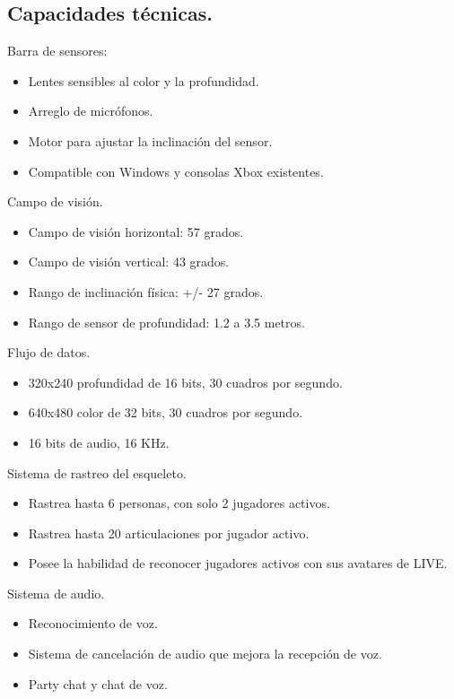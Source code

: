 \documentclass[11pt,a4paper]{article}
\begin{document}
\subsection{Capacidades técnicas.}
Barra de sensores: \cite{Play.com}  
\begin{itemize} %
\item Lentes sensibles al color y la profundidad.
\item Arreglo de micrófonos.
\item Motor para ajustar la inclinación del sensor.
\item Compatible con Windows y consolas Xbox existentes.
\end{itemize}
Campo de visión.
\begin{itemize} 
\item Campo de visión horizontal: 57 grados.
\item Campo de visión vertical: 43 grados.
\item Rango de inclinación física: +/- 27 grados.
\item Rango de sensor de profundidad:  1.2 a 3.5 metros.
\end{itemize}
Flujo de datos. 
\begin{itemize} 
\item 320x240  profundidad de 16 bits, 30 cuadros por segundo.
\item 640x480 color de 32 bits, 30 cuadros por segundo.
\item 16 bits de audio, 16 KHz.
\end{itemize}
Sistema de rastreo del esqueleto.
\begin{itemize} 
\item Rastrea hasta 6 personas, con solo 2 jugadores activos.
\item Rastrea hasta 20 articulaciones por jugador activo.
\item Posee la habilidad de reconocer jugadores activos con sus avatares de LIVE.
\end{itemize}
Sistema de audio.
\begin{itemize} 
\item Reconocimiento de voz.
\item Sistema de cancelación de audio que mejora la recepción de voz.
\item Party chat y chat de voz.
\end{itemize}
\end{document}
